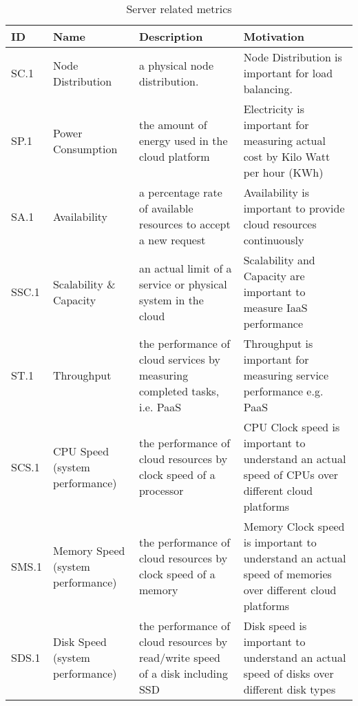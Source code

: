 \begin{table*}[P]
\caption{Server related metrics}
\begin{scriptsize}
\label{T:metrics}
\bigskip
\begin{center}
\begin{tabular}{lp{}p{}p{}}
\hline
\rowcolor{blue!20}   \bf ID & \bf Name & \bf Description & \bf Motivation \\
\hline
SC.1 & 
Node Distribution & 
a physical node distribution. & 
Node Distribution is important for load balancing. \\
\hline
SP.1 &
Power Consumption&
the amount of energy used in the cloud platform  &
Electricity is important for measuring actual cost by Kilo Watt per hour (KWh) \\
\hline
SA.1 &
Availability&
a percentage rate of available resources to accept a new request &
Availability is important to provide cloud resources continuously \\
\hline
SSC.1 &
Scalability \& Capacity&
an actual limit of a service or physical system in the cloud &
Scalability and Capacity are important to measure IaaS performance \\
\hline
ST.1 &
Throughput &
the performance of cloud services by measuring completed tasks, i.e. PaaS &
Throughput is important for measuring service performance e.g. PaaS \\
\hline
SCS.1 &
CPU Speed (system performance)&
the performance of cloud resources by clock speed of a processor &
CPU Clock speed is important to understand an actual speed of CPUs over different cloud platforms \\
\hline
SMS.1 &
Memory Speed (system performance)&
the performance of cloud resources by clock speed of a memory &
Memory Clock speed is important to understand an actual speed of memories over different cloud platforms \\
\hline
SDS.1 &
Disk Speed (system performance)&
the performance of cloud resources by read/write speed of a disk including SSD &
Disk speed is important to understand an actual speed of disks over
                                                                                 different disk types \\
\hline
\end{tabular}
\end{center}
\end{scriptsize}
\end{table*}

